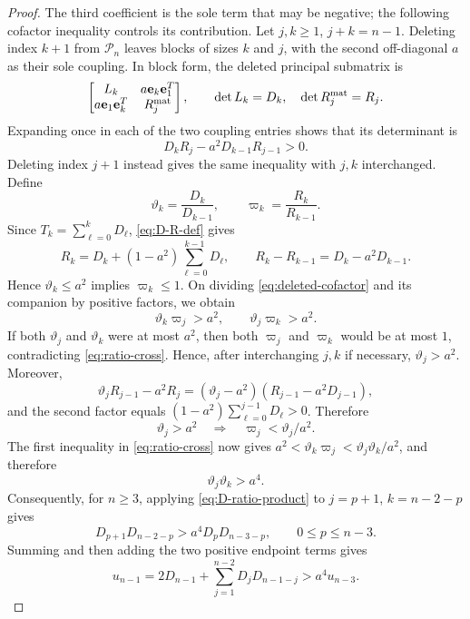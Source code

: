 \documentclass[12pt,anonymous]{iopjournal}
\numberwithin{equation}{section}
\theoremstyle{remark}
\begin{document}
\begin{proof}
The third coefficient is the sole term that may be negative; the following
cofactor inequality controls its contribution.  Let \(j,k\geq1\),
\(j+k=n-1\).  Deleting index \(k+1\) from \(\mathcal P_n\) leaves blocks of
sizes \(k\) and \(j\), with the second off-diagonal \(a\) as their sole
coupling.  In block form, the deleted principal submatrix is
\[
 \begin{bmatrix}
  L_k&a \mathbf e_k\mathbf e_1^T\\
  a \mathbf e_1\mathbf e_k^T&R_j^{\rm mat}
 \end{bmatrix},
 \qquad \det L_k=D_k,\quad \det R_j^{\rm mat}=R_j.
\]
Expanding once in each of the two coupling entries shows that its
determinant is
\begin{equation}\label{eq:deleted-cofactor}
 D_kR_j-a^2D_{k-1}R_{j-1}>0.
\end{equation}
Deleting index \(j+1\) instead gives the same inequality with \(j,k\)
interchanged.  Define
\[
 \vartheta_k=\frac{D_k}{D_{k-1}},\qquad
 \varpi_k=\frac{R_k}{R_{k-1}}.
\]
Since \(T_k=\sum_{\ell=0}^kD_\ell\), \eqref{eq:D-R-def} gives
\begin{equation}\label{eq:R-D-relation}
 R_k=D_k+(1-a^2)\sum_{\ell=0}^{k-1}D_\ell,\qquad
 R_k-R_{k-1}=D_k-a^2D_{k-1}.
\end{equation}
Hence \(\vartheta_k\leq a^2\) implies \(\varpi_k\leq1\).  On dividing
\eqref{eq:deleted-cofactor} and its companion by positive factors, we
obtain
\begin{equation}\label{eq:ratio-cross}
 \vartheta_k\varpi_j>a^2,\qquad \vartheta_j\varpi_k>a^2.
\end{equation}
If both \(\vartheta_j\) and \(\vartheta_k\) were at most \(a^2\), then
both \(\varpi_j\) and \(\varpi_k\) would be at most \(1\),
contradicting \eqref{eq:ratio-cross}.  Hence, after interchanging
\(j,k\) if necessary, \(\vartheta_j>a^2\).  Moreover,
\[
 \vartheta_jR_{j-1}-a^2R_j
 =(\vartheta_j-a^2)(R_{j-1}-a^2D_{j-1}),
\]
and the second factor equals
\((1-a^2)\sum_{\ell=0}^{j-1}D_\ell>0\).  Therefore
\[
 \vartheta_j>a^2\quad\Longrightarrow\quad
 \varpi_j<\vartheta_j/a^2.
\]
The first inequality in \eqref{eq:ratio-cross} now gives
\(a^2<\vartheta_k\varpi_j<\vartheta_j\vartheta_k/a^2\), and therefore
\begin{equation}\label{eq:D-ratio-product}
 \vartheta_j\vartheta_k>a^4.
\end{equation}
Consequently, for \(n\geq3\),
applying \eqref{eq:D-ratio-product} to \(j=p+1\), \(k=n-2-p\) gives
\[
 D_{p+1}D_{n-2-p}>a^4D_pD_{n-3-p},
 \qquad0\leq p\leq n-3.
\]
Summing and then adding the two positive endpoint terms gives
\begin{equation}\label{eq:u-absorption}
 u_{n-1}=2D_{n-1}+\sum_{j=1}^{n-2}D_jD_{n-1-j}>a^4u_{n-3}.
\end{equation}


\end{proof}
\end{document}
